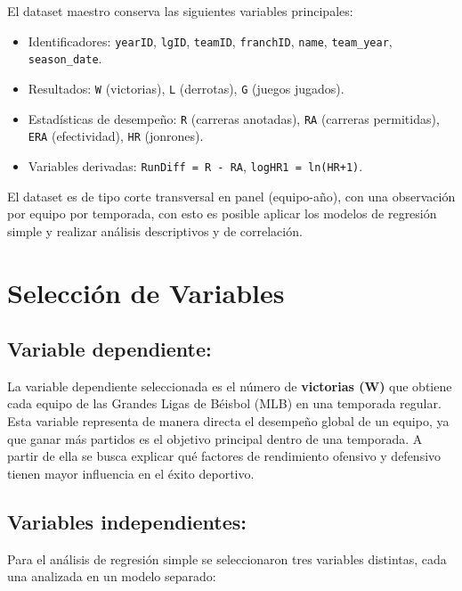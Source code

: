 \documentclass[man,floatsintext]{apa7}
\begin{document}
El dataset maestro conserva las siguientes variables principales:
\begin{itemize}
    \item Identificadores: \texttt{yearID}, \texttt{lgID}, \texttt{teamID}, \texttt{franchID}, \texttt{name}, \texttt{team\_year}, \texttt{season\_date}.
    \item Resultados: \texttt{W} (victorias), \texttt{L} (derrotas), \texttt{G} (juegos jugados).
    \item Estadísticas de desempeño: \texttt{R} (carreras anotadas), \texttt{RA} (carreras permitidas), \texttt{ERA} (efectividad), \texttt{HR} (jonrones).
    \item Variables derivadas: \texttt{RunDiff = R - RA}, \texttt{logHR1 = ln(HR+1)}.
\end{itemize}

El dataset es de tipo corte transversal en panel (equipo-año), con una observación por equipo por temporada, con esto es posible aplicar los modelos de regresión simple y realizar análisis descriptivos y de correlación.
\section{Selección de Variables}
\subsection{Variable dependiente:}
La variable dependiente seleccionada es el número de \textbf{victorias (W)} que obtiene cada equipo de las Grandes Ligas de Béisbol (MLB) en una temporada regular. Esta variable representa de manera directa el desempeño global de un equipo, ya que ganar más partidos es el objetivo principal dentro de una temporada. A partir de ella se busca explicar qué factores de rendimiento ofensivo y defensivo tienen mayor influencia en el éxito deportivo.
\subsection{Variables independientes:}
Para el análisis de regresión simple se seleccionaron tres variables distintas, cada una analizada en un modelo separado:%
\end{document}
